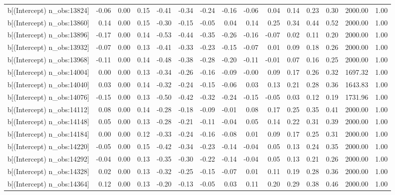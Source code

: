 \begin{table}[ht]
\begin{tabular}{rrrrrrrrrrrrrrr}
  b[(Intercept) n\_obs:13824] & -0.06 & 0.00 & 0.15 & -0.41 & -0.34 & -0.24 & -0.16 & -0.06 & 0.04 & 0.14 & 0.23 & 0.30 & 2000.00 & 1.00 \\ 
  b[(Intercept) n\_obs:13860] & 0.14 & 0.00 & 0.15 & -0.30 & -0.15 & -0.05 & 0.04 & 0.14 & 0.25 & 0.34 & 0.44 & 0.52 & 2000.00 & 1.00 \\ 
  b[(Intercept) n\_obs:13896] & -0.17 & 0.00 & 0.14 & -0.53 & -0.44 & -0.35 & -0.26 & -0.16 & -0.07 & 0.02 & 0.11 & 0.20 & 2000.00 & 1.00 \\ 
  b[(Intercept) n\_obs:13932] & -0.07 & 0.00 & 0.13 & -0.41 & -0.33 & -0.23 & -0.15 & -0.07 & 0.01 & 0.09 & 0.18 & 0.26 & 2000.00 & 1.00 \\ 
  b[(Intercept) n\_obs:13968] & -0.11 & 0.00 & 0.14 & -0.48 & -0.38 & -0.28 & -0.20 & -0.11 & -0.01 & 0.07 & 0.16 & 0.25 & 2000.00 & 1.00 \\ 
  b[(Intercept) n\_obs:14004] & 0.00 & 0.00 & 0.13 & -0.34 & -0.26 & -0.16 & -0.09 & -0.00 & 0.09 & 0.17 & 0.26 & 0.32 & 1697.32 & 1.00 \\ 
  b[(Intercept) n\_obs:14040] & 0.03 & 0.00 & 0.14 & -0.32 & -0.24 & -0.15 & -0.06 & 0.03 & 0.13 & 0.21 & 0.28 & 0.36 & 1643.83 & 1.00 \\ 
  b[(Intercept) n\_obs:14076] & -0.15 & 0.00 & 0.13 & -0.50 & -0.42 & -0.32 & -0.24 & -0.15 & -0.05 & 0.03 & 0.12 & 0.19 & 1731.96 & 1.00 \\ 
  b[(Intercept) n\_obs:14112] & 0.08 & 0.00 & 0.14 & -0.28 & -0.18 & -0.09 & -0.01 & 0.08 & 0.17 & 0.25 & 0.35 & 0.41 & 2000.00 & 1.00 \\ 
  b[(Intercept) n\_obs:14148] & 0.05 & 0.00 & 0.13 & -0.28 & -0.21 & -0.11 & -0.04 & 0.05 & 0.14 & 0.22 & 0.31 & 0.39 & 2000.00 & 1.00 \\ 
  b[(Intercept) n\_obs:14184] & 0.00 & 0.00 & 0.12 & -0.33 & -0.24 & -0.16 & -0.08 & 0.01 & 0.09 & 0.17 & 0.25 & 0.31 & 2000.00 & 1.00 \\ 
  b[(Intercept) n\_obs:14220] & -0.05 & 0.00 & 0.15 & -0.42 & -0.34 & -0.23 & -0.14 & -0.04 & 0.05 & 0.13 & 0.24 & 0.35 & 2000.00 & 1.00 \\ 
  b[(Intercept) n\_obs:14292] & -0.04 & 0.00 & 0.13 & -0.35 & -0.30 & -0.22 & -0.14 & -0.04 & 0.05 & 0.13 & 0.21 & 0.26 & 2000.00 & 1.00 \\ 
  b[(Intercept) n\_obs:14328] & 0.02 & 0.00 & 0.13 & -0.32 & -0.25 & -0.15 & -0.07 & 0.01 & 0.11 & 0.19 & 0.28 & 0.36 & 2000.00 & 1.00 \\ 
  b[(Intercept) n\_obs:14364] & 0.12 & 0.00 & 0.13 & -0.20 & -0.13 & -0.05 & 0.03 & 0.11 & 0.20 & 0.29 & 0.38 & 0.46 & 2000.00 & 1.00 \\ 

\end{tabular}
\end{table}
